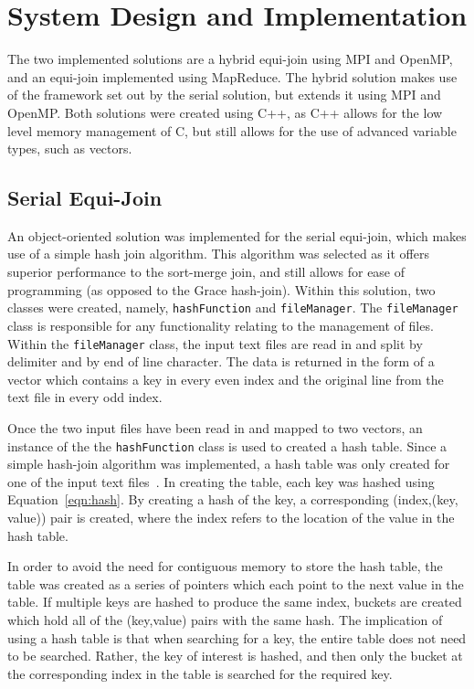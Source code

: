 \documentclass[11pt,twocolumn]{witseiepaper}
\begin{document}
\section{System Design and Implementation}
The two implemented solutions are a hybrid equi-join using MPI and OpenMP, and an equi-join implemented using MapReduce. The hybrid solution makes use of the framework set out by the serial solution, but extends it using MPI and OpenMP. Both solutions were created using C++, as C++ allows for the low level memory management of C, but still allows for the use of advanced variable types, such as vectors.

\subsection{Serial Equi-Join}
An object-oriented solution was implemented for the serial equi-join, which makes use of a simple hash join algorithm. This algorithm was selected as it offers superior performance to the sort-merge join, and still allows for ease of programming (as opposed to the Grace hash-join). Within this solution, two classes were created, namely, \texttt{hashFunction} and \texttt{fileManager}. The \texttt{fileManager} class is responsible for any functionality relating to the management of files. Within the \texttt{fileManager} class, the input text files are read in and split by delimiter and by end of line character. The data is returned in the form of a vector which contains a key in every even index and the original line from the text file in every odd index.

Once the two input files have been read in and mapped to two vectors, an instance of the the \texttt{hashFunction} class is used to created a hash table. Since a simple hash-join algorithm was implemented, a hash table was only created for one of the input text files~\cite{evaluating4JoinAlgorithms}. In creating the table, each key was hashed using Equation~\ref{eqn:hash}. By creating a hash of the key, a corresponding (index,(key, value)) pair is created, where the index refers to the location of the value in the hash table. 

In order to avoid the need for contiguous memory to store the hash table, the table was created as a series of pointers which each point to the next value in the table. If multiple keys are hashed to produce the same index, buckets are created which hold all of the (key,value) pairs with the same hash. The implication of using a hash table is that when searching for a key, the entire table does not need to be searched. Rather, the key of interest is hashed, and then only the bucket at the corresponding index in the table is searched for the required key.
\end{document}
